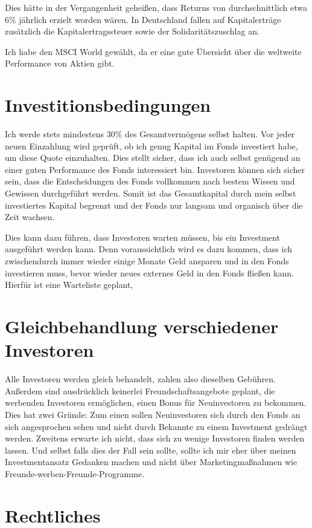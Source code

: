 \documentclass{article}
\begin{document}
Dies hätte in der Vergangenheit geheißen, dass Returns von durchschnittlich etwa 6\% jährlich erzielt worden wären. In Deutschland fallen auf Kapitalerträge zusätzlich die Kapitalertragssteuer sowie der Solidaritätszuschlag an.

Ich habe den MSCI World gewählt, da er eine gute Übersicht über die weltweite Performance von Aktien gibt.

\section{Investitionsbedingungen}

Ich werde stets mindestens 30\% des Gesamtvermögens selbst halten. Vor jeder neuen Einzahlung wird geprüft, ob ich genug Kapital im Fonds investiert habe, um diese Quote einzuhalten. Dies stellt sicher, dass ich auch selbst genügend an einer guten Performance des Fonds interessiert bin. Investoren können sich sicher sein, dass die Entscheidungen des Fonds vollkommen nach bestem Wissen und Gewissen durchgeführt werden. Somit ist das Gesamtkapital durch mein selbst investiertes Kapital begrenzt und der Fonds nur langsam und organisch über die Zeit wachsen.

Dies kann dazu führen, dass Investoren warten müssen, bis ein Investment ausgeführt werden kann. Denn voraussichtlich wird es dazu kommen, dass ich zwischendurch immer wieder einige Monate Geld ansparen und in den Fonds investieren muss, bevor wieder neues externes Geld in den Fonds fließen kann. Hierfür ist eine Warteliste geplant, 




\section{Gleichbehandlung verschiedener Investoren}

Alle Investoren werden gleich behandelt, zahlen also dieselben Gebühren. Außerdem sind ausdrücklich keinerlei Freundschaftsangebote geplant, die werbenden Investoren ermöglichen, einen Bonus für Neuinvestoren zu bekommen. Dies hat zwei Gründe: Zum einen sollen Neuinvestoren sich durch den Fonds an sich angesprochen sehen und nicht durch Bekannte zu einem Investment gedrängt werden. Zweitens erwarte ich nicht, dass sich zu wenige Investoren finden werden lassen. Und selbst falls dies der Fall sein sollte, sollte ich mir eher über meinen Investmentansatz Gedanken machen und nicht über Marketingmaßnahmen wie Freunde-werben-Freunde-Programme. 
\section{Rechtliches}
\end{document}
